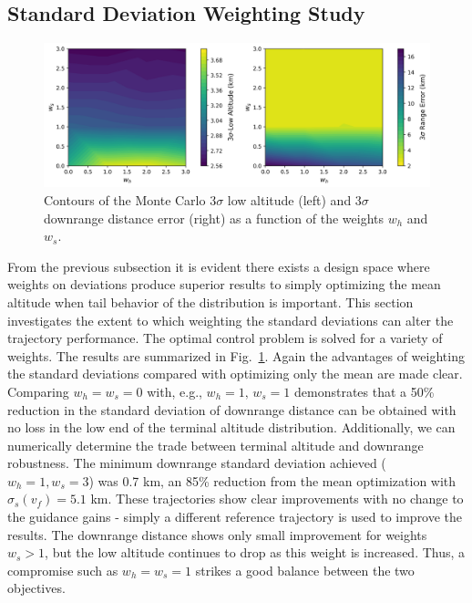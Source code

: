 \documentclass[journal ]{new-aiaa}
\begin{document}
\subsection*{Standard Deviation Weighting Study}
\begin{figure}[h!]
	\centering
	\includegraphics[width=1\textwidth]{ddp/python/WeightSweepMC}
	\caption{Contours of the Monte Carlo 3$\sigma$ low altitude (left) and 3$\sigma$ downrange distance error (right) as a function of the weights $w_h$ and $w_s$.}
	\label{fig_weight_sweep}
\end{figure}
From the previous subsection it is evident there exists a design space where weights on deviations produce superior results to simply optimizing the mean altitude when tail behavior of the distribution is important. This section investigates the extent to which weighting the standard deviations can alter the trajectory performance. The optimal control problem is solved for a variety of weights. The results are summarized in Fig.~\ref{fig_weight_sweep}. Again the advantages of weighting the standard deviations compared with optimizing only the mean are made clear. Comparing $w_h=w_s=0$ with, e.g., $w_h=1,\,w_s = 1$ demonstrates that a 50\% reduction in the standard deviation of downrange distance can be obtained with no loss in the low end of the terminal altitude distribution. Additionally, we can numerically determine the trade between terminal altitude and downrange robustness. The minimum downrange standard deviation achieved ($w_h=1,w_s=3$) was 0.7 km, an 85\% reduction from the mean optimization with $\sigma_s(v_f)=5.1$ km. These trajectories show clear improvements with no change to the guidance gains - simply a different reference trajectory is used to improve the results. The downrange distance shows only small improvement for weights $w_s>1$, but the low altitude continues to drop as this weight is increased. Thus, a compromise such as $w_h=w_s=1$ strikes a good balance between the two objectives. 
\end{document}
